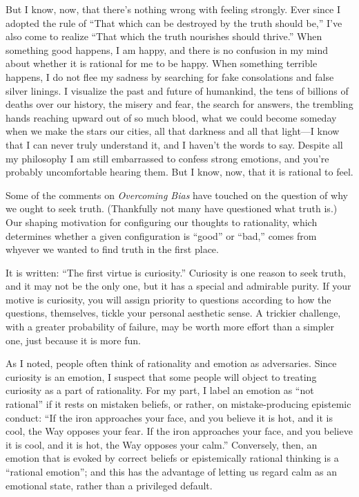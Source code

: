 {
 But I know, now, that there's nothing wrong with
feeling strongly. Ever since I adopted the rule of
``That which can be destroyed by the truth should
be,'' I've also come to realize
``That which the truth nourishes should
thrive.'' When something good happens, I am happy,
and there is no confusion in my mind about whether it is rational for
me to be happy. When something terrible happens, I do not flee my
sadness by searching for fake consolations and false silver linings. I
visualize the past and future of humankind, the tens of billions of
deaths over our history, the misery and fear, the search for answers,
the trembling hands reaching upward out of so much blood, what we could
become someday when we make the stars our cities, all that darkness and
all that light---I know that I can never truly understand it, and I
haven't the words to say. Despite all my philosophy I
am still embarrassed to confess strong emotions, and
you're probably uncomfortable hearing them. But I know,
now, that it is rational to feel.}

\myendsectiontext

\label{why_truth}

{
 Some of the comments on \textit{Overcoming Bias} have touched on
the question of why we ought to seek truth. (Thankfully not many have
questioned what truth is.) Our shaping motivation for configuring our
thoughts to rationality, which determines whether a given configuration
is ``good'' or
``bad,'' comes from whyever we
wanted to find truth in the first place. }

{
 It is written: ``The first virtue is
curiosity.'' Curiosity is one reason to seek truth,
and it may not be the only one, but it has a special and admirable
purity. If your motive is curiosity, you will assign priority to
questions according to how the questions, themselves, tickle your
personal aesthetic sense. A trickier challenge, with a greater
probability of failure, may be worth more effort than a simpler one,
just because it is more fun.}

{
 As I noted, people often think of rationality and emotion as
adversaries. Since curiosity is an emotion, I suspect that some people
will object to treating curiosity as a part of rationality. For my
part, I label an emotion as ``not
rational'' if it rests on mistaken beliefs, or
rather, on mistake-producing epistemic conduct: ``If
the iron approaches your face, and you believe it is hot, and it is
cool, the Way opposes your fear. If the iron approaches your face, and
you believe it is cool, and it is hot, the Way opposes your
calm.'' Conversely, then, an emotion that is evoked
by correct beliefs or epistemically rational thinking is a
``rational emotion''; and this has
the advantage of letting us regard calm as an emotional state, rather
than a privileged default.}

